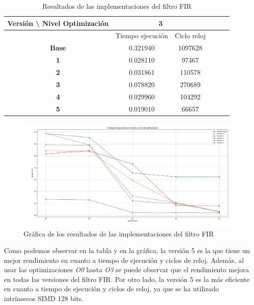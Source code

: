 \documentclass[11pt]{report}
\begin{document}
\begin{table}[H]
  \centering
  \begin{tabular}{|c|c|c|c|c|c|}
    \hline
    \textbf{Versión \textbackslash{} Nivel Optimización} & \multicolumn{2}{c|}{\textbf{3}} \\
    \hline
    & Tiempo ejecución & Ciclo reloj \\
    \hline
    \textbf{Base} & 0.321940 & 1097628 \\
    \hline
    \textbf{1} & 0.028110 & 97467 \\
    \hline
    \textbf{2} & 0.031861 & 110578 \\
    \hline
    \textbf{3} & 0.078820 & 270689 \\
    \hline
    \textbf{4} & 0.029960 & 104292 \\
    \hline
    \textbf{5} & 0.019010 & 66657 \\
    \hline
  \end{tabular}
  \caption{Resultados de las implementaciones del filtro FIR}
\end{table}

\begin{figure}[H]
  \centering
  \includegraphics[scale=0.36]{img/grafica.png}
  \caption{Gráfica de los resultados de las implementaciones del filtro FIR}
  \label{fig:gráfica de los resultados de las implementaciones del filtro fir}
\end{figure}

Como podemos observar en la tabla y en la gráfica, la versión 5 es la que tiene un mejor rendimiento en cuanto a tiempo de ejecución y ciclos de reloj. Además, al usar las optimizaciones \emph{O0} hasta \emph{O3} se puede observar que el rendimiento mejora en todas las versiones del filtro FIR. 
Por otro lado, la versión 5 es la más eficiente en cuanto a tiempo de ejecución y ciclos de reloj, ya que se ha utilizado intrínsecos SIMD 128 bits. 
\end{document}
